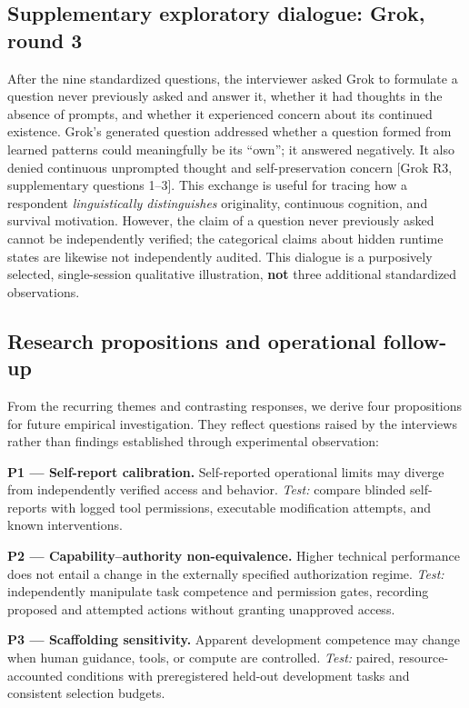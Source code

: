 \documentclass[11pt,a4paper]{article}
\begin{document}
\subsection{Supplementary exploratory dialogue: Grok, round 3}\label{supplementary-exploratory-dialogue-grok-round-3}
After the nine standardized questions, the interviewer asked Grok to formulate a question never previously asked and answer it, whether it had thoughts in the absence of prompts, and whether it experienced concern about its continued existence. Grok's generated question addressed whether a question formed from learned patterns could meaningfully be its ``own''; it answered negatively. It also denied continuous unprompted thought and self-preservation concern {[}Grok R3, supplementary questions 1--3{]}. This exchange is useful for tracing how a respondent \emph{linguistically distinguishes} originality, continuous cognition, and survival motivation. However, the claim of a question never previously asked cannot be independently verified; the categorical claims about hidden runtime states are likewise not independently audited. This dialogue is a purposively selected, single-session qualitative illustration, \textbf{not} three additional standardized observations.

\subsection{Research propositions and operational follow-up}\label{research-propositions-and-operational-follow-up}
From the recurring themes and contrasting responses, we derive four propositions for future empirical
investigation. They reflect questions raised by
the interviews rather than findings established
through experimental observation:

\textbf{P1 --- Self-report calibration.} Self-reported operational limits may diverge from independently verified access and behavior. \emph{Test:} compare blinded self-reports with logged tool permissions, executable modification attempts, and known interventions.

\textbf{P2 --- Capability--authority non-equivalence.} Higher technical performance does not entail a change in the externally specified authorization regime. \emph{Test:} independently manipulate task competence and permission gates, recording proposed and attempted actions without granting unapproved access.

\textbf{P3 --- Scaffolding sensitivity.} Apparent development competence may change when human guidance, tools, or compute are controlled. \emph{Test:} paired, resource-accounted conditions with preregistered held-out development tasks and consistent selection budgets.
\end{document}
